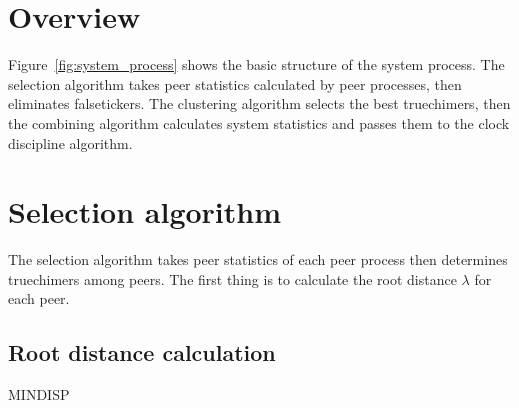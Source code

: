 \section{Overview}%
\label{sec:system_overview}

Figure~\ref{fig:system_process} shows the basic structure of the system process.
The selection algorithm takes peer statistics calculated by peer processes,
then eliminates falsetickers. The clustering algorithm selects the best
truechimers, then the combining algorithm calculates system statistics and
passes them to the clock discipline algorithm.



\section{Selection algorithm}%
\label{sec:selection_algorithm}
The selection algorithm takes peer statistics of each peer process then
determines truechimers among peers. The first thing is to calculate the root
distance $\lambda$ for each peer.

\subsection{Root distance calculation}%
\label{sub:root_distance_calculation}

\begin{myverbbox}
    {\mindisp}MINDISP
\end{myverbbox}

